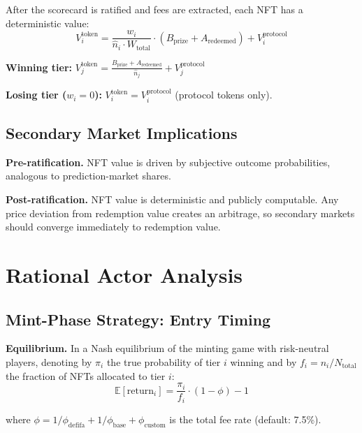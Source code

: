 \documentclass[11pt,a4paper]{article}
\begin{document}
After the scorecard is ratified and fees are extracted, each NFT has a deterministic value:
\begin{equation}
V_i^{\text{token}} = \frac{w_i}{\hat{n}_i \cdot W_{\text{total}}} \cdot (B_{\text{prize}} + A_{\text{redeemed}}) + V_i^{\text{protocol}}
\end{equation}

\textbf{Winning tier:} $V_j^{\text{token}} = \frac{B_{\text{prize}} + A_{\text{redeemed}}}{\hat{n}_j} + V_j^{\text{protocol}}$

\textbf{Losing tier ($w_i = 0$):} $V_i^{\text{token}} = V_i^{\text{protocol}}$ (protocol tokens only).

\subsection{Secondary Market Implications}

\textbf{Pre-ratification.} NFT value is driven by subjective outcome probabilities, analogous to prediction-market shares.

\textbf{Post-ratification.} NFT value is deterministic and publicly computable. Any price deviation from redemption value creates an arbitrage, so secondary markets should converge immediately to redemption value.

\section{Rational Actor Analysis}

\subsection{Mint-Phase Strategy: Entry Timing}

\textbf{Equilibrium.} In a Nash equilibrium of the minting game with risk-neutral players, denoting by $\pi_i$ the true probability of tier $i$ winning and by $f_i = n_i / N_{\text{total}}$ the fraction of NFTs allocated to tier $i$:
\begin{equation}
\mathbb{E}[\text{return}_i] = \frac{\pi_i}{f_i} \cdot (1 - \phi) - 1
\end{equation}

where $\phi = 1/\phi_{\text{defifa}} + 1/\phi_{\text{base}} + \phi_{\text{custom}}$ is the total fee rate (default: 7.5\%).
\end{document}
